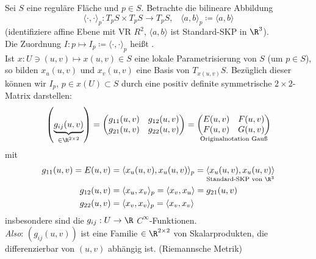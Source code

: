 \begin{remark}
  Sei \( S \) eine reguläre Fläche und \( p \in S \). Betrachte die bilineare Abbildung
  \begin{equation*}
    \langle \cdot, \cdot \rangle_p : T_p S \times T_p S \to T_p S\text{,} \quad \langle a, b \rangle_p \coloneqq \langle a, b \rangle
  \end{equation*}
  (identifiziere affine Ebene mit VR \( R^2 \), \( \langle a, b \rangle \) ist Standard-SKP in \( \R^3 \)). \\
  Die Zuordnung \( I: p \mapsto I_p \coloneqq \langle \cdot, \cdot \rangle_p \) heißt \label{def:ersteFundamentalform}. \\
  Ist \( x: U \ni (u,v) \mapsto x(u,v) \in S \) eine lokale Parametrisierung von \( S \) (um \( p \in S \)), so bilden \( x_u(u,v) \) und \( x_v(u,v) \) eine Basis von \( T_{x(u,v)}S \). Bezüglich dieser können wir \( I_p \), \( p \in x(U) \subset S \) durch eine positiv definite symmetrische \( 2 \times 2 \)-Matrix darstellen:
  \begin{equation*}
      \left( \underbrace{g_{ij}(u,v)}_{\in \R^{2 \times 2}} \right) = \begin{pmatrix}
        g_{11}(u,v) & g_{12}(u,v) \\
        g_{21}(u,v) & g_{22}(u,v)
      \end{pmatrix} = \underset{\text{Originalnotation Gauß}}{\begin{pmatrix}
        E(u,v) & F(u,v) \\
        F(u,v) & G(u,v)
      \end{pmatrix}}
  \end{equation*}
  mit
  \begin{align*}
    g_{11}(u,v) = E(u,v) &= \langle x_u(u,v),x_u(u,v) \rangle_p = \underset{\text{Standard-SKP von }\R^3}{\langle x_u(u,v),x_u(u,v) \rangle} \\
    g_{12}(u,v) &= \langle x_u, x_v \rangle_p = \langle x_v, x_u \rangle = g_{21}(u,v) \\
    g_{22}(u,v) &= \langle x_v, x_v \rangle_p = \langle x_v, x_v \rangle
  \end{align*}
  insbesondere sind die \( g_{ij}: U \to \R \) \( C^\infty \)-Funktionen. \\
  \emph{Also}: \( \left( g_{ij}(u,v) \right) \) ist eine Familie \( \in \R^{2\times 2} \) von Skalarprodukten, die differenzierbar von \( (u,v) \) abhängig ist. (Riemannsche Metrik)
\end{remark}


